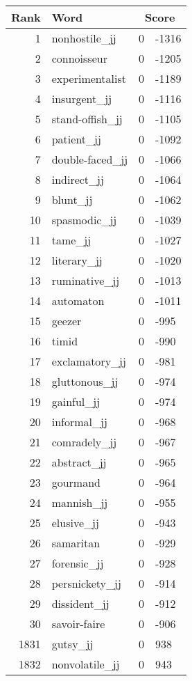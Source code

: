 \begin{longtable}[!htbp]{| rlr@{.}l |}
    \hline
    \textbf{Rank} & \textbf{Word} & \multicolumn{2}{c|}{\textbf{Score}} \\
    \hline
    \endhead
    1 & nonhostile\_jj & 0 & -1316 \\
    2 & connoisseur & 0 & -1205 \\
    3 & experimentalist & 0 & -1189 \\
    4 & insurgent\_jj & 0 & -1116 \\
    5 & stand-offish\_jj & 0 & -1105 \\
    6 & patient\_jj & 0 & -1092 \\
    7 & double-faced\_jj & 0 & -1066 \\
    8 & indirect\_jj & 0 & -1064 \\
    9 & blunt\_jj & 0 & -1062 \\
    10 & spasmodic\_jj & 0 & -1039 \\
    11 & tame\_jj & 0 & -1027 \\
    12 & literary\_jj & 0 & -1020 \\
    13 & ruminative\_jj & 0 & -1013 \\
    14 & automaton & 0 & -1011 \\
    15 & geezer & 0 & -995 \\
    16 & timid & 0 & -990 \\
    17 & exclamatory\_jj & 0 & -981 \\
    18 & gluttonous\_jj & 0 & -974 \\
    19 & gainful\_jj & 0 & -974 \\
    20 & informal\_jj & 0 & -968 \\
    21 & comradely\_jj & 0 & -967 \\
    22 & abstract\_jj & 0 & -965 \\
    23 & gourmand & 0 & -964 \\
    24 & mannish\_jj & 0 & -955 \\
    25 & elusive\_jj & 0 & -943 \\
    26 & samaritan & 0 & -929 \\
    27 & forensic\_jj & 0 & -928 \\
    28 & persnickety\_jj & 0 & -914 \\
    29 & dissident\_jj & 0 & -912 \\
    30 & savoir-faire & 0 & -906 \\
    1831 & gutsy\_jj & 0 & 938 \\
    1832 & nonvolatile\_jj & 0 & 943 \\

\end{longtable}
